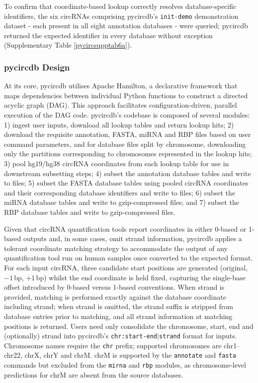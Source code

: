 To confirm that coordinate-based lookup correctly resolves database-specific identifiers, the six circRNAs comprising pycircdb's \texttt{init-demo} demonstration dataset - each present in all eight annotation databases - were queried; pycircdb returned the expected identifier in every database without exception (Supplementary Table \ref{pycircsupptab6a}).


\subsubsection{pycircdb Design}
At its core, pycircdb utilises Apache Hamilton, a declarative framework that maps dependencies between individual Python functions to construct a directed acyclic graph (DAG). This approach facilitates configuration-driven, parallel execution of the DAG code. pycircdb's codebase is composed of several modules: 1) ingest user inputs, download all lookup tables and return lookup hits; 2) download the requisite annotation, FASTA, miRNA and RBP files based on user command parameters, and for database files split by chromosome, downloading only the partitions corresponding to chromosomes represented in the lookup hits; 3) pool hg19/hg38 circRNA coordinates from each lookup table for use in downstream subsetting steps; 4) subset the annotation database tables and write to files; 5) subset the FASTA database tables using pooled circRNA coordinates and their corresponding database identifiers and write to files; 6) subset the miRNA database tables and write to gzip-compressed files; and 7) subset the RBP database tables and write to gzip-compressed files. 

Given that circRNA quantification tools report coordinates in either 0-based or 1-based outputs and, in some cases, omit strand information, pycircdb applies a tolerant coordinate matching strategy to accommodate the output of any quantification tool run on human samples once converted to the expected format. For each input circRNA, three candidate start positions are generated (original, $-1$\,bp, $+1$\,bp) whilst the end coordinate is held fixed, capturing the single-base offset introduced by 0-based versus 1-based conventions. When strand is provided, matching is performed exactly against the database coordinate including strand; when strand is omitted, the strand suffix is stripped from database entries prior to matching, and all strand information at matching positions is returned. Users need only consolidate the chromosome, start, end and (optionally) strand into pycircdb's \texttt{chr:start-end$\vert$strand} format for inputs. Chromosome names require the \texttt{chr} prefix; supported chromosomes are chr1--chr22, chrX, chrY and chrM. chrM is supported by the \texttt{annotate} and \texttt{fasta} commands but excluded from the \texttt{mirna} and \texttt{rbp} modules, as chromosome-level predictions for chrM are absent from the source databases. 

